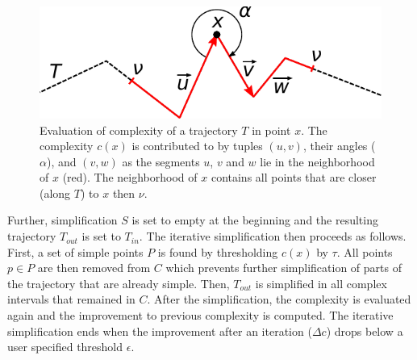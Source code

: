 \begin{figure}
	\includegraphics[width=0.95\linewidth]{img/complexity.pdf}
\caption{Evaluation of complexity of a trajectory $T$ in point $x$.
The complexity $c(x)$ is contributed to by tuples $(u, v)$, \ie their angles ($\alpha$), and $(v, w)$ as the segments $u$, $v$ and $w$ lie in the neighborhood of $x$ (red).
The neighborhood of $x$ contains all points that are closer (along $T$) to $x$ then $\nu$.}
\label{fig:complexity}
\end{figure}

Further, simplification $S$ is set to empty at the beginning and the resulting trajectory $T_{out}$ is set to $T_{in}$.
The iterative simplification then proceeds as follows.
First, a set of simple points $P$ is found by thresholding $c(x)$ by $\tau$.
All points $p \in P$ are then removed from $C$ which prevents further simplification of parts of the trajectory that are already simple.
Then, $T_{out}$ is simplified in all complex intervals that remained in $C$.
After the simplification, the complexity is evaluated again and the improvement to previous complexity is computed.
The iterative simplification ends when the improvement after an iteration ($\Delta c$) drops below a user specified threshold $\epsilon$.